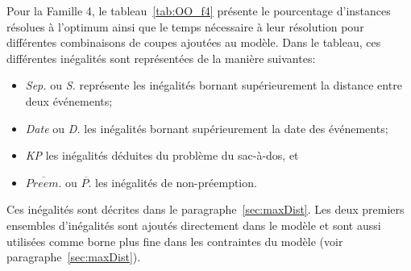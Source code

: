 Pour la Famille 4, le tableau~\ref{tab:OO_f4} présente le pourcentage
d'instances résolues à l'optimum ainsi que le temps nécessaire à leur 
résolution pour différentes combinaisons de coupes ajoutées au
modèle. Dans le tableau, ces différentes inégalités sont représentées
de la manière suivantes: 
\begin{itemize}
\item {\it Sep.} ou {\it S.} représente les inégalités
 bornant supérieurement la distance entre deux événements;
\item {\it Date} ou {\it D.} les inégalités bornant supérieurement la
  date des événements;
\item {\it KP} les inégalités déduites du problème du sac-à-dos, et  
\item {\it $\overline{Preem.}$} ou {\it $\overline{P.}$} les
  inégalités de non-préemption.
\end{itemize}
Ces inégalités sont décrites dans le paragraphe~\ref{sec:maxDist}. 
 Les deux premiers ensembles d'inégalités sont ajoutés directement
 dans le modèle et sont aussi utilisées comme borne plus fine dans les
 contraintes du modèle (voir paragraphe~\ref{sec:maxDist}).


